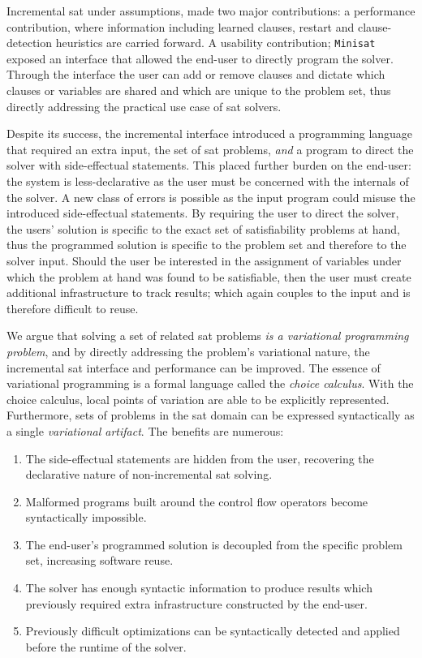 Incremental \ac{sat} under assumptions, made two major contributions: a
performance contribution, where information including learned clauses, restart
and clause-detection heuristics are carried forward. A usability contribution;
\texttt{Minisat} exposed an interface that allowed the end-user to directly
program the solver. Through the interface the user can add or remove clauses and
dictate which clauses or variables are shared and which are unique to the
problem set, thus directly addressing the practical use case of \ac{sat}
solvers.

Despite its success, the incremental interface introduced a programming language
that required an extra input, the set of \ac{sat} problems, \emph{and} a program
to direct the solver with side-effectual statements. This placed further burden
on the end-user: the system is less-declarative as the user must be concerned
with the internals of the solver. A new class of errors is possible as the input
program could misuse the introduced side-effectual statements. By requiring the
user to direct the solver, the users' solution is specific to the exact set of
satisfiability problems at hand, thus the programmed solution is specific to the
problem set and therefore to the solver input. Should the user be interested in
the assignment of variables under which the problem at hand was found to be
satisfiable, then the user must create additional infrastructure to track
results; which again couples to the input and is therefore difficult to reuse.

We argue that solving a set of related \ac{sat} problems \emph{is a variational
  programming problem}, and by directly addressing the problem's variational
nature, the incremental \ac{sat} interface and performance can be improved. The
essence of variational programming is a formal language called the \emph{choice
  calculus}. With the choice calculus, local points of variation are able to be
explicitly represented. Furthermore, sets of problems in the \ac{sat} domain can
be expressed syntactically as a single \emph{variational artifact}. The benefits
are numerous:
\begin{enumerate}
\item The side-effectual statements are hidden from the user, recovering the
  declarative nature of non-incremental \ac{sat} solving.
\item Malformed programs built around the control flow operators become
  syntactically impossible.
\item The end-user's programmed solution is decoupled from the specific problem
  set, increasing software reuse.
\item The solver has enough syntactic information to produce results which
  previously required extra infrastructure constructed by the end-user.
\item Previously difficult optimizations can be syntactically detected and
  applied before the runtime of the solver.
\end{enumerate}


